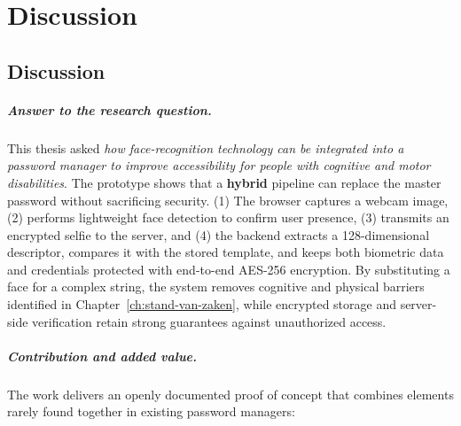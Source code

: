
\chapter{Discussion}%
\label{ch:conclusie}


\section{Discussion}

\paragraph{Answer to the research question.}
This thesis asked \emph{how face-recognition technology can be integrated into a password manager to improve accessibility for people with cognitive and motor disabilities}.  
The prototype shows that a \textbf{hybrid} pipeline can replace the master password without sacrificing security.  
(1) The browser captures a webcam image, (2) performs lightweight face detection to confirm user presence, (3) transmits an encrypted selfie to the server, and (4) the backend extracts a 128-dimensional descriptor, compares it with the stored template, and keeps both biometric data and credentials protected with end-to-end AES-256 encryption.  
By substituting a face for a complex string, the system removes cognitive and physical barriers identified in Chapter~\ref{ch:stand-van-zaken}, while encrypted storage and server-side verification retain strong guarantees against unauthorized access.

\paragraph{Contribution and added value.}
The work delivers an openly documented proof of concept that combines elements rarely found together in existing password managers:

